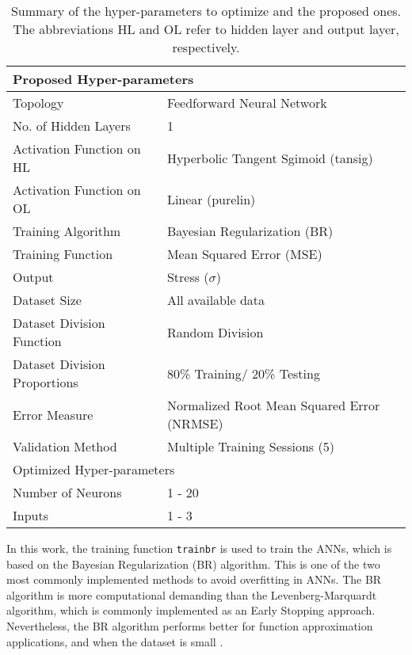 \begin{table}[!htb]
    \centering
    \caption{Summary of the hyper-parameters to optimize and the proposed ones. The abbreviations HL and OL refer to hidden layer and output layer, respectively.}
    \begin{tabular}{l l}
    \toprule
    \multicolumn{2}{l}{Proposed Hyper-parameters} \\
    \hline
    Topology                         & Feedforward Neural Network \\
    No. of Hidden Layers             & 1 \\
    Activation Function on HL        & Hyperbolic Tangent Sgimoid (tansig)\\
    Activation Function on OL        & Linear (purelin)\\
    Training Algorithm               & Bayesian Regularization (BR)\\
    Training Function                & Mean Squared Error (MSE)\\
    Output                           & Stress ($\sigma$)\\
    Dataset Size                     & All available data\\
    Dataset Division Function        & Random Division  \\
    Dataset Division Proportions     & 80\% Training/ 20\% Testing\\
    Error Measure                    & Normalized Root Mean Squared Error (NRMSE)\\
    Validation Method                & Multiple Training Sessions (5)\\
    \midrule
    \multicolumn{2}{l}{Optimized Hyper-parameters}\\
    \hline
    Number of Neurons            & 1 - 20 \\
    Inputs                       & 1 - 3 \\
    \bottomrule
    \end{tabular}
    \label{tbl:ANN_parameters}
\end{table}

In this work, the training function \texttt{trainbr} is used to train the ANNs, which is based on the Bayesian Regularization (BR) algorithm. This is one of the two most commonly implemented methods to avoid overfitting in ANNs. The BR algorithm is more computational demanding than the Levenberg-Marquardt algorithm, which is commonly implemented as an Early Stopping approach. Nevertheless, the BR algorithm performs better for function approximation applications, and when the dataset is small \cite{matlab2019improve}.

